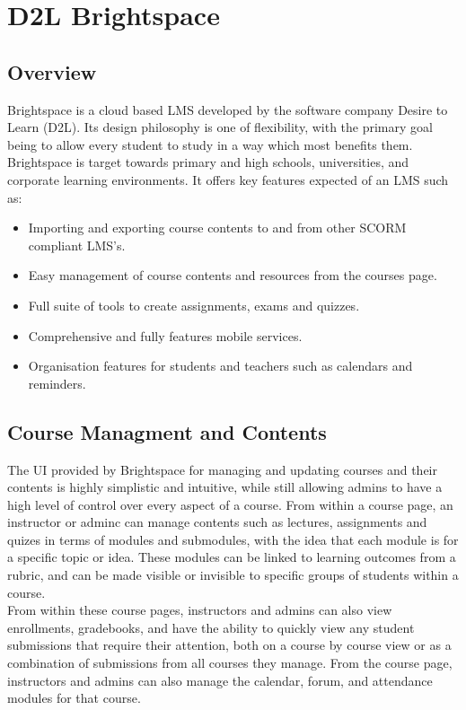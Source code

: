 \section{D2L Brightspace}
\subsection{Overview}
Brightspace is a cloud based LMS developed by the software company Desire to Learn (D2L). Its design philosophy is one of flexibility, with the primary goal being to allow every student to study in a way which most benefits them. Brightspace is target towards primary and high schools, universities, and corporate learning environments. It offers key features expected of an LMS such as:
\begin{itemize}
  \item Importing and exporting course contents to and from other SCORM compliant LMS's.
  \item Easy management of course contents and resources from the courses page.
  \item Full suite of tools to create assignments, exams and quizzes.
  \item Comprehensive and fully features mobile services.
  \item Organisation features for students and teachers such as calendars and reminders.
\end{itemize}

\subsection{Course Managment and Contents}
The UI provided by Brightspace for managing and updating courses and their contents is highly simplistic and intuitive, while still allowing admins to have a high level of control over every aspect of a course. From within a course page, an instructor or adminc can manage contents such as lectures, assignments and quizes in terms of modules and submodules, with the idea that each module is for a specific topic or idea. These modules can be linked to learning outcomes from a rubric, and can be made visible or invisible to specific groups of students within a course.\\ 
From within these course pages, instructors and admins can also view enrollments, gradebooks, and have the ability to quickly view any student submissions that require their attention, both on a course by course view or as a combination of submissions from all courses they manage. From the course page, instructors and admins can also manage the calendar, forum, and attendance modules for that course.

